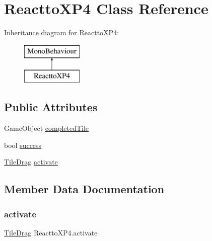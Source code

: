 \hypertarget{class_reactto_x_p4}{}\section{Reactto\+X\+P4 Class Reference}
\label{class_reactto_x_p4}
Inheritance diagram for Reactto\+X\+P4\+:\begin{figure}[H]
\begin{center}
\leavevmode
\includegraphics[height=2.000000cm]{class_reactto_x_p4}
\end{center}
\end{figure}
\subsection*{Public Attributes}
\begin{DoxyCompactItemize}
\item 
Game\+Object \hyperlink{class_reactto_x_p4_a72a8a9e024f55d905eacfdfc4ae156c9}{completed\+Tile}
\item 
bool \hyperlink{class_reactto_x_p4_a285fc5dfa251d2a1a68155c8bd99752e}{success}
\item 
\hyperlink{class_tile_drag}{Tile\+Drag} \hyperlink{class_reactto_x_p4_ac17064d7a277f08c55e67fea662bfa0e}{activate}
\end{DoxyCompactItemize}


\subsection{Member Data Documentation}
\mbox{\label{class_reactto_x_p4_ac17064d7a277f08c55e67fea662bfa0e}} 
\subsubsection{\texorpdfstring{activate}{activate}}
{\footnotesize\ttfamily \hyperlink{class_tile_drag}{Tile\+Drag} Reactto\+X\+P4.\+activate}

\mbox{\label{class_reactto_x_p4_a72a8a9e024f55d905eacfdfc4ae156c9}} 

